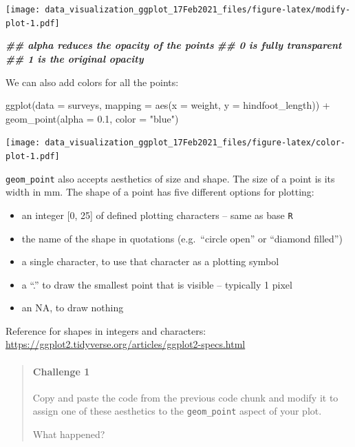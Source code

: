 \documentclass[
]{article}
\newenvironment{Shaded}{\begin{snugshade}}{\end{snugshade}}
\newcommand{\AttributeTok}[1]{\textcolor[rgb]{0.77,0.63,0.00}{#1}}
\newcommand{\DocumentationTok}[1]{\textcolor[rgb]{0.56,0.35,0.01}{\textbf{\textit{#1}}}}
\newcommand{\FloatTok}[1]{\textcolor[rgb]{0.00,0.00,0.81}{#1}}
\newcommand{\FunctionTok}[1]{\textcolor[rgb]{0.00,0.00,0.00}{#1}}
\newcommand{\NormalTok}[1]{#1}
\newcommand{\SpecialCharTok}[1]{\textcolor[rgb]{0.00,0.00,0.00}{#1}}
\newcommand{\StringTok}[1]{\textcolor[rgb]{0.31,0.60,0.02}{#1}}
\providecommand{\tightlist}{%
  \setlength{\itemsep}{0pt}\setlength{\parskip}{0pt}}
\begin{document}
\texttt{[image: data\_visualization\_ggplot\_17Feb2021\_files/figure-latex/modify-plot-1.pdf]}

\begin{Shaded}
\begin{Highlighting}[]
\DocumentationTok{\#\# alpha reduces the opacity of the points }
\DocumentationTok{\#\# 0 is fully transparent}
\DocumentationTok{\#\# 1 is the original opacity}
\end{Highlighting}
\end{Shaded}

We can also add colors for all the points:

\begin{Shaded}
\begin{Highlighting}[]
\FunctionTok{ggplot}\NormalTok{(}\AttributeTok{data =}\NormalTok{ surveys, }
       \AttributeTok{mapping =} \FunctionTok{aes}\NormalTok{(}\AttributeTok{x =}\NormalTok{ weight, }\AttributeTok{y =}\NormalTok{ hindfoot\_length)) }\SpecialCharTok{+}
  \FunctionTok{geom\_point}\NormalTok{(}\AttributeTok{alpha =} \FloatTok{0.1}\NormalTok{, }\AttributeTok{color =} \StringTok{"blue"}\NormalTok{)}
\end{Highlighting}
\end{Shaded}

\texttt{[image: data\_visualization\_ggplot\_17Feb2021\_files/figure-latex/color-plot-1.pdf]}

\texttt{geom\_point} also accepts aesthetics of size and shape. The size
of a point is its width in mm. The shape of a point has five different
options for plotting:

\begin{itemize}
\tightlist
\item
  an integer {[}0, 25{]} of defined plotting characters -- same as base
  \texttt{R}
\item
  the name of the shape in quotations (e.g.~``circle open'' or ``diamond
  filled'')
\item
  a single character, to use that character as a plotting symbol
\item
  a ``.'' to draw the smallest point that is visible -- typically 1
  pixel
\item
  an NA, to draw nothing
\end{itemize}

Reference for shapes in integers and characters:\\
\url{https://ggplot2.tidyverse.org/articles/ggplot2-specs.html}

\begin{quote}
\mbox{}%
\hypertarget{challenge-1}{%
\paragraph{Challenge 1}\label{challenge-1}}

Copy and paste the code from the previous code chunk and modify it to
assign one of these aesthetics to the \texttt{geom\_point} aspect of
your plot.

What happened?
\end{quote}
\end{document}
